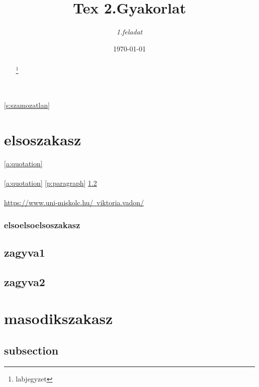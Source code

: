 \documentclass[twoside,12pt]{article}
\begin{document}
\pagestyle{fancy}
\fancyhead[C]{}
\fancyhead[R]{\thepage}
\fancyhead[LE]{\leftmark}
\fancyhead[LO]{\rightmark}
\renewcommand{\footrulewidth}{0.4pt}

\title{\textbf{Tex 2.Gyakorlat}}
\author{\textit{1.feladat}}
\date{\today}
\maketitle

\autoref{s:szamozatlan}
\begin{abstract}
\hulipsum[1-2]

\footnote{labjegyzet}
\end{abstract}

\setcounter{tocdepth}{5}
\tableofcontents


\clearpage
{}
\section{elsoszakasz}
\autoref{a:quotation}\\
\\
\ref{a:quotation} 
\ref{p:paragraph} 
\ref{s:zagyva2}
\\
\pageref{a:quotation}
\pageref{p:paragraph}
\pageref{s:zagyva2}
\\
\href{https://www.uni-miskolc.hu/~viktoria.vadon/}{https://www.uni-miskolc.hu/~viktoria.vadon/}

\subsubsection{elsoelsoelsoszakasz}
\subsection{zagyva1}
\hulipsum[1-2]
\clearpage
\subsection{zagyva2}
\label{s:zagyva2}
\hulipsum[3-4]
\clearpage
\section[section2]{masodikszakasz}
\setcounter{secnumdepth}{5}
\subsection{subsection}
\end{document}
